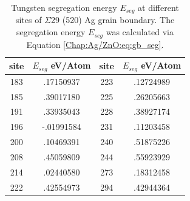 \begin{table}[!ht]
\caption[Tungsten segregation energy $E_{seg}$ at different sites of $\Sigma$29 (520) Ag grain boundary.]{Tungsten segregation energy $E_{seg}$ at different sites of $\Sigma$29 (520) Ag grain boundary. The segregation energy $E_{seg}$ was calculated via Equation \ref{Chap:Ag/ZnO:eq:gb_seg}.}
\label{Chap:Ag/ZnO:tab3}
\centering
\begin{tabular}{cccc}
\hline
\hline
site & $E_{seg}$ eV/Atom & site & $E_{seg}$ eV/Atom\\ 
\hline
183  & .17150937     & 223  & .12724989   \\
185  & .39017180     & 225  & .26205663   \\
191  & .33935043     & 228  & .38927174   \\
196  & -.01991584    & 231  & .11203458   \\
200  & .10469391     & 240  & .51875226   \\
208  & .45059809     & 244  & .55923929   \\
214  & .02440580     & 273  & .18312458   \\
222  & .42554973     & 294  & .42944364   \\
\hline
\hline
\end{tabular}
\end{table}